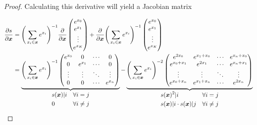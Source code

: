 \documentclass[11pt]{article}
\newcommand{\pd}{\partial}
\newcommand{\bs}{\boldsymbol}
\begin{document}
\begin{proof}
	Calculating this derivative will yield a Jacobian matrix

	\begin{align}
		\frac{\pd s}{\pd \bs{x}}
		&=
		\Bigg(\Sum_{x_i\in\bs{x}}e^{x_i}\Bigg)^{-1}
		\frac{\pd}{\pd\bs{x}}
		\begin{pmatrix}
			e^{x_0} \\
			e^{x_1} \\
			\vdots \\
			e^{x_K}
		\end{pmatrix}
		+
		\frac{\pd}{\pd \bs{x}} \Bigg(\Sum_{x_i\in\bs{x}}e^{x_i}\Bigg)^{-1}
		\begin{pmatrix}
			e^{x_0} \\
			e^{x_1} \\
			\vdots \\
			e^{x_K}
		\end{pmatrix}
		\\
		&=
		\underbrace{
			\Bigg(\Sum_{x_i\in\bs{x}}e^{x_i}\Bigg)^{-1}
			\begin{pmatrix}
				e^{x_0} & 0 & \cdots & 0 \\
				0 & e^{x_1} & \cdots & 0 \\
				\vdots & \vdots & \ddots & \vdots \\
				0 & 0 & \cdots & e^{x_n} \\
			\end{pmatrix}
		}_{
			\begin{aligned}
				&s(\bs{x})\vert i &\forall i=j \\
				&0 &\forall i\neq j \\
			\end{aligned}
		}
		-
		\underbrace{
			\Bigg(\Sum_{x_i\in\bs{x}}e^{x_i}\Bigg)^{-2}
			\begin{pmatrix}
				e^{2 x_0} & e^{x_1 + x_0}  & \cdots & e^{x_n + x_0} \\
				e^{x_0 +x_1} & e^{2 x_1} & \cdots & e^{x_n + x_1} \\
				\vdots & \vdots & \ddots & \vdots \\
				e^{x_0 + x_n} & e^{x_1 + x_n}  & \cdots & e^{2 x_n} \\
			\end{pmatrix}
		}_{
			\begin{aligned}
				&s(\bs{x})^2\vert i &\forall i=j \\
				&s(\bs{x})\vert i\cdot
					s(\bs{x})\vert j
					&\forall i\neq j \\
			\end{aligned}
		}
		\\
	\end{align}


\end{proof}
\end{document}
